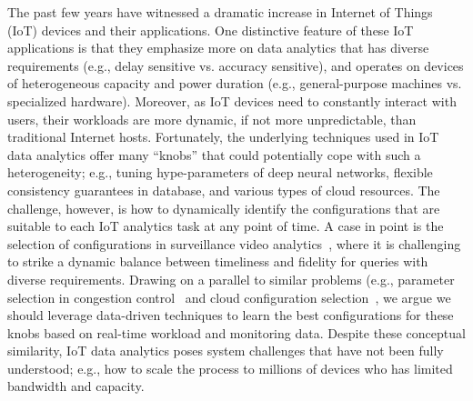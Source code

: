 The past few years have witnessed a dramatic increase in Internet of Things (IoT) devices 
and their applications. One distinctive feature of these IoT applications is that they 
emphasize more on data analytics that has diverse requirements (e.g., delay sensitive vs. 
accuracy sensitive),  and operates on devices of heterogeneous capacity and power duration 
(e.g., general-purpose machines vs. specialized hardware). 
Moreover, as IoT devices need to constantly interact with users, their workloads are more 
dynamic, if not more unpredictable, than traditional Internet hosts.
Fortunately, the underlying techniques used in IoT data analytics offer many ``knobs'' that 
could potentially cope with such a heterogeneity; e.g., tuning hype-parameters of deep 
neural networks,  flexible consistency guarantees in database, and various types of
cloud resources.
The challenge, however, is how to dynamically identify the configurations
that are suitable to each IoT analytics task at any point of time.
A case in point is the selection of configurations in surveillance video 
analytics~\cite{zhang2017live}, where it is challenging to strike a dynamic 
balance between timeliness and fidelity for queries with diverse requirements.
Drawing on a parallel to similar problems (e.g., parameter selection in congestion 
control~\cite{remy} and cloud configuration selection~\cite{cherrypick}, 
we argue we should leverage data-driven techniques to learn the best configurations 
for these knobs based on real-time workload and monitoring data.
Despite these conceptual similarity, IoT data analytics poses system challenges that have 
not been fully understood; e.g., how to scale the process to millions of
devices who has limited bandwidth and capacity.





